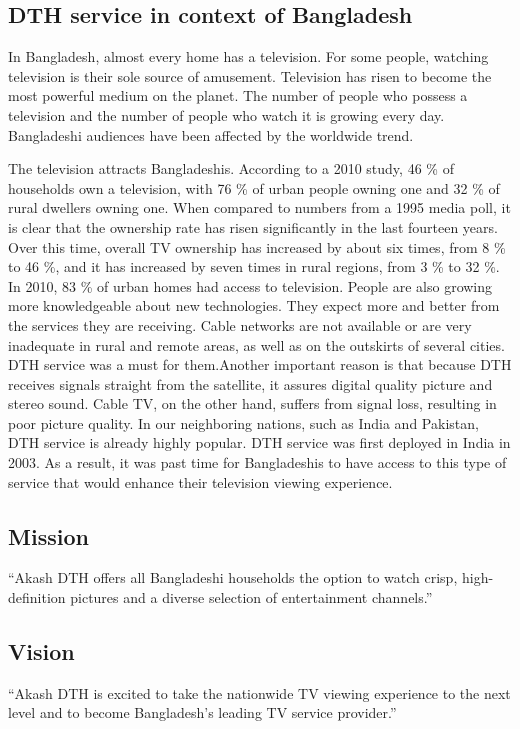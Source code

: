 \begin{spacing}{1.0}
\subsection{DTH service in context of Bangladesh}
In Bangladesh, almost every home has a television. For some people, watching television is their sole source of amusement.
Television has risen to become the most powerful medium on the planet. The number of people who possess a television and the number of people who watch it is growing every day. Bangladeshi audiences have been affected by the worldwide trend.

The television attracts Bangladeshis. According to a 2010 study, 46 \% of households own a television, with 76 \% of urban people owning one and 32 \% of rural dwellers owning one.
When compared to numbers from a 1995 media poll, it is clear that the ownership rate has risen significantly in the last fourteen years. Over this time, overall TV ownership has increased by about six times, from 8 \% to 46 \%, and it has increased by seven times in rural regions, from 3 \% to 32 \%. In 2010, 83 \% of urban homes had access to television. People are also growing more knowledgeable about new technologies. They expect more and better from the services they are receiving. Cable networks are not available or are very inadequate in rural and remote areas, as well as on the outskirts of several cities. DTH service was a must for them.Another important reason is that because DTH receives signals straight from the satellite, it assures digital quality picture and stereo sound. Cable TV, on the other hand, suffers from signal loss, resulting in poor picture quality. In our neighboring nations, such as India and Pakistan, DTH service is already highly popular. DTH service was first deployed in India in 2003. As a result, it was past time for Bangladeshis to have access to this type of service that would enhance their television viewing experience.
\subsection{Mission}
“Akash DTH offers all Bangladeshi households the option to watch crisp, high-definition pictures and a diverse selection of entertainment channels.” 
\subsection{Vision}
“Akash DTH is excited to take the nationwide TV viewing experience to the next level and to become Bangladesh's leading TV service provider.” 

\end{spacing}
